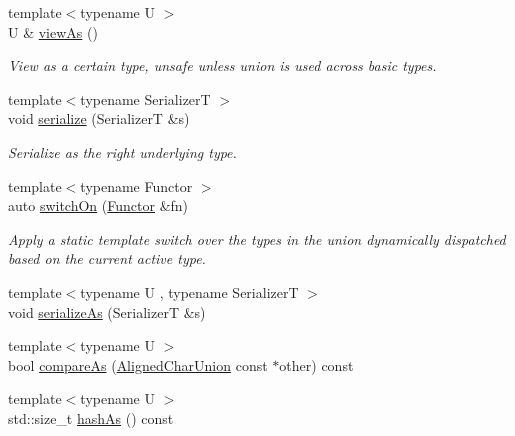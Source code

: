 \begin{DoxyCompactItemize}
{\footnotesize template$<$typename U $>$ }\\U \& \hyperlink{structvt_1_1util_1_1adt_1_1_aligned_char_union_af9bd3e00a355dca08d88103852f716ce}{view\+As} ()
\begin{DoxyCompactList}\small\item\em View as a certain type, unsafe unless union is used across basic types. \end{DoxyCompactList}\item 
{\footnotesize template$<$typename SerializerT $>$ }\\void \hyperlink{structvt_1_1util_1_1adt_1_1_aligned_char_union_a3b7862db1eb10fc16c66aa09a4e3fec6}{serialize} (SerializerT \&s)
\begin{DoxyCompactList}\small\item\em Serialize as the right underlying type. \end{DoxyCompactList}\item 
{\footnotesize template$<$typename Functor $>$ }\\auto \hyperlink{structvt_1_1util_1_1adt_1_1_aligned_char_union_a27ee4ceddaa0fda39ef9be9164959f11}{switch\+On} (\hyperlink{namespacevt_af182285b57b225b163d5d8aff03cb8c2ac61e9f48e514369f0eb8ac5cebf9fb14}{Functor} \&fn)
\begin{DoxyCompactList}\small\item\em Apply a static template switch over the types in the union dynamically dispatched based on the current active type. \end{DoxyCompactList}\item 
{\footnotesize template$<$typename U , typename SerializerT $>$ }\\void \hyperlink{structvt_1_1util_1_1adt_1_1_aligned_char_union_a1278b482c837c11fd2f6f41b7f8b0f33}{serialize\+As} (SerializerT \&s)
\item 
{\footnotesize template$<$typename U $>$ }\\bool \hyperlink{structvt_1_1util_1_1adt_1_1_aligned_char_union_ac2ba0a705e45724c9882b904b5c1231b}{compare\+As} (\hyperlink{structvt_1_1util_1_1adt_1_1_aligned_char_union}{Aligned\+Char\+Union} const $\ast$other) const
\item 
{\footnotesize template$<$typename U $>$ }\\std\+::size\+\_\+t \hyperlink{structvt_1_1util_1_1adt_1_1_aligned_char_union_a7c7bfb6979d827a602e4aba1f6886cb8}{hash\+As} () const
\end{DoxyCompactItemize}

